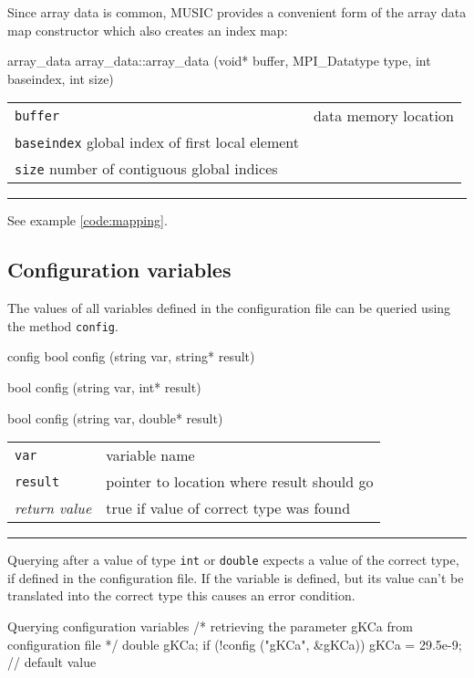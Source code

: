 \documentclass[a4paper]{report}
\makeatletter
\newenvironment{parameters}%
{\begin{tabular}{@{\hspace{2em}}lp{0.6\textwidth}}}%
{\end{tabular}\par\vspace{1mm}\par\hrule\par\vspace{5mm}}
\makeatother
\begin{document}
Since array data is common, MUSIC provides a convenient form of the
array data map constructor which also creates an index map:

\begin{head}{array_data}
  array_data::array_data (void* buffer,
                          MPI_Datatype type,
                          int  baseindex,
                          int size)
\end{head}
\begin{parameters}
  \lstinline|buffer| & data memory location \\
  \lstinline|baseindex| global index of first local element  &  \\
  \lstinline|size| number of contiguous global indices  &  \\
\end{parameters}

See example \ref{code:mapping}.

\subsection{Configuration variables}

The values of all variables defined in the configuration file can be
queried using the method \lstinline|config|.

\begin{head}{config}
  bool config (string var, string* result)

  bool config (string var, int* result)

  bool config (string var, double* result)
\end{head}
\begin{parameters}
  \lstinline|var| & variable name \\
  \lstinline|result| & pointer to location where result should go \\
  \emph{return value} & true if value of correct type was found \\
\end{parameters}

Querying after a value of type \lstinline|int| or \lstinline|double|
expects a value of the correct type, if defined in the configuration
file.  If the variable is defined, but its value can't be translated
into the correct type this causes an error condition.

\begin{code}{Querying configuration variables}
  /* retrieving the parameter gKCa from configuration file */
  double gKCa;
  if (!config ("gKCa", &gKCa))
    gKCa = 29.5e-9; // default value
\end{code}
\end{document}
